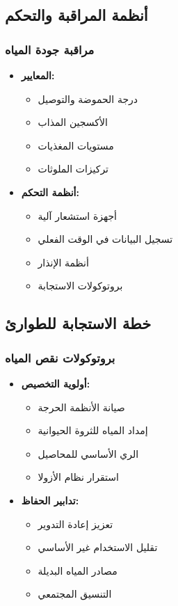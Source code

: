 \subsection{أنظمة المراقبة والتحكم}

\subsubsection{مراقبة جودة المياه}
\begin{itemize}
    \item \textbf{المعايير:}
    \begin{itemize}
        \item درجة الحموضة والتوصيل
        \item الأكسجين المذاب
        \item مستويات المغذيات
        \item تركيزات الملوثات
    \end{itemize}
    
    \item \textbf{أنظمة التحكم:}
    \begin{itemize}
        \item أجهزة استشعار آلية
        \item تسجيل البيانات في الوقت الفعلي
        \item أنظمة الإنذار
        \item بروتوكولات الاستجابة
    \end{itemize}
\end{itemize}

\subsection{خطة الاستجابة للطوارئ}

\subsubsection{بروتوكولات نقص المياه}
\begin{itemize}
    \item \textbf{أولوية التخصيص:}
    \begin{itemize}
        \item صيانة الأنظمة الحرجة
        \item إمداد المياه للثروة الحيوانية
        \item الري الأساسي للمحاصيل
        \item استقرار نظام الأزولا
    \end{itemize}
    
    \item \textbf{تدابير الحفاظ:}
    \begin{itemize}
        \item تعزيز إعادة التدوير
        \item تقليل الاستخدام غير الأساسي
        \item مصادر المياه البديلة
        \item التنسيق المجتمعي
    \end{itemize}
\end{itemize}
